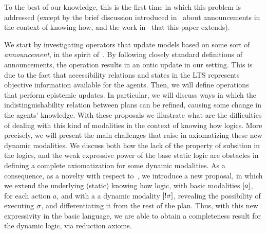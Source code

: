To the best of our knowledge, this is the first time in which this problem is addressed (except by the brief discussion introduced in~\cite{Wang2016} about announcements in the context of knowing how, and the work in~\cite{AFSV22} that this paper extends). 

We start by investigating operators that update models based on some sort of \emph{announcement}, in the spirit of~\cite{Plaza89:lopc}. By following closely standard definitions of announcements, the operation results in an ontic update in our setting. This is due to the fact that accessibility relations and states in the LTS represents objective information available for the agents. Then, we will define operations that perform epistemic updates. In particular, we will discuss ways in which the indistinguishability relation between plans can be refined, causing some change in the agents' knowledge. With these proposals we illustrate what are the difficulties of dealing with this kind of modalities in the context of knowing how logics. More precisely, we will present the main challenges that raise in axiomatizing these new dynamic modalities. We discuss both how the lack of the property of subsition in the logics, and the weak expressive power of the base static logic are obstacles in defining a complete axiomatization for some dynamic modalities. As a consequence, as a novelty with respect to~\cite{AFSV22}, we introduce a new proposal, in which we extend the underlying (static) knowing how logic, with basic modalities $[a]$, for each action $a$, and with a a dynamic modality $[!\sigma]$, revealing the possibility of executing $\sigma$, and differentiating it from the rest of the plan. Thus, with this new expressivity in the basic language, we are able to obtain a completeness result for the dynamic logic, via reduction axioms.

